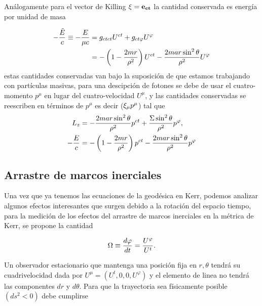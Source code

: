 Análogamente para el vector de Killing $\mathbf{\xi} = \mathbf{e_{ct}}$ la cantidad conservada es energía por unidad de masa

\begin{equation}
    \begin{aligned}
       - \frac{\tilde{E}}{c} \equiv -\frac{E}{\mu c} & = g_{ ct ct}   U^{ct}  +g_{ ct \varphi}  U^\varphi                                           \\
                                       & =   -\left(1-\frac{2 mr}{\rho^2}\right)  U^{ct} -    \frac{2 mar \sin^2\theta}{\rho^2}    U^\varphi
    \end{aligned}
\end{equation}
estas cantidades conservadas van bajo la suposición de que estamos trabajando con partículas masivas, para una descipción de fotones se debe de usar el cuatro-momento $p^\mu$ en lugar del cuatro-velocidad $U^\mu$, y las cantidades conservadas  se reescriben en términos de $p^\mu$ es decir ($\mathbf{\xi}_\mu p^\mu$) tal que
\begin{align}
    L_z & =- \frac{2 mar \sin^2\theta}{\rho^2}   p^{ct} + \frac{\Sigma \sin^2\theta}{\rho^2}  p^\varphi,       \\
    - \frac{E}{c}  & =  - \left(1-\frac{2 mr}{\rho^2}\right)  p^{ct} -   \frac{2 mar \sin^2\theta}{\rho^2}    p^\varphi
\end{align}



\subsection{Arrastre de marcos inerciales}
Una vez que ya tenemos las ecuaciones de la geodésica en Kerr, podemos analizar algunos efectos interesantes que surgen debido a la rotación del espacio tiempo, para la medición de los efectos del arrastre de marcos inerciales en la métrica de Kerr, se propone la cantidad

\begin{equation}
    \Omega \equiv \frac{d \varphi}{d t}=\frac{U^{\varphi}}{U^t}.
\end{equation}

Un observador estacionario que mantenga una posición fija en $r,\theta$ tendrá su cuadrivelocidad dada por  $U^\mu=\left(U^t, 0,0, U^{\varphi}\right)$ y el elemento de linea no tendrá las componentes $dr$ y $d\theta$.
Para que la trayectoria sea físicamente posible $\left(d s^2<0\right)$ debe cumplirse


